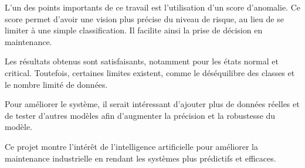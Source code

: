 \documentclass[a4paper,12pt]{article}
\begin{document}
L’un des points importants de ce travail est l’utilisation d’un score d’anomalie. Ce score permet d’avoir une vision plus précise du niveau de risque, au lieu de se limiter à une simple classification. Il facilite ainsi la prise de décision en maintenance.

Les résultats obtenus sont satisfaisants, notamment pour les états normal et critical. Toutefois, certaines limites existent, comme le déséquilibre des classes et le nombre limité de données.

Pour améliorer le système, il serait intéressant d’ajouter plus de données réelles et de tester d’autres modèles afin d’augmenter la précision et la robustesse du modèle.

Ce projet montre l’intérêt de l’intelligence artificielle pour améliorer la maintenance industrielle en rendant les systèmes plus prédictifs et efficaces.
\end{document}

